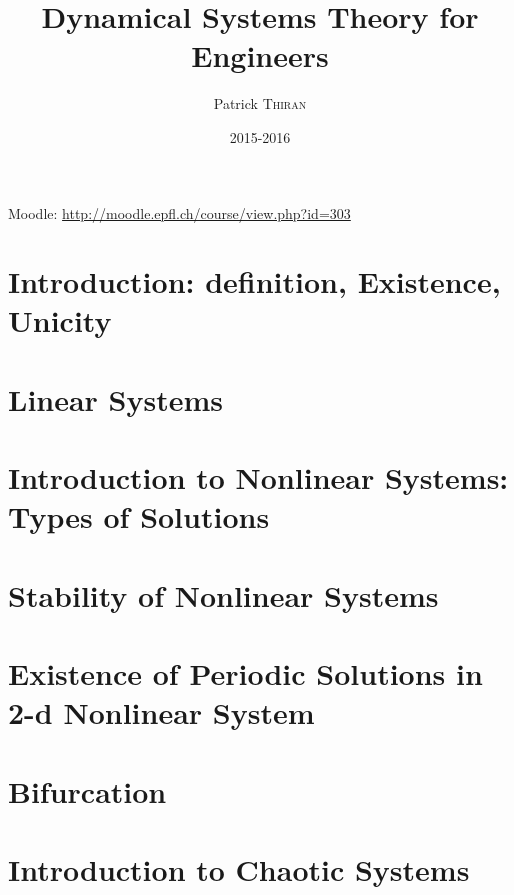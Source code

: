 

\title{Dynamical Systems Theory for Engineers}
\author{Patrick \textsc{Thiran}}
\date{2015-2016}


\maketitle
\tableofcontents

\newpage

Moodle: \url{http://moodle.epfl.ch/course/view.php?id=303}


\chapter{Introduction: definition, Existence, Unicity}

\chapter{Linear Systems}

\chapter{Introduction to Nonlinear Systems: Types of Solutions}

\chapter{Stability of Nonlinear Systems}

\chapter{Existence of Periodic Solutions in 2-d Nonlinear System}

\chapter{Bifurcation}

\chapter{Introduction to Chaotic Systems}



\nocite{*}







